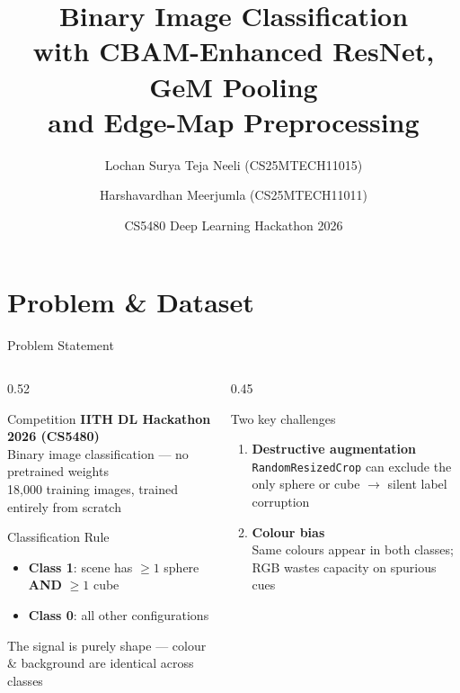 \documentclass[aspectratio=169]{beamer}
\author[Neeli \& Meerjumla]{%
  Lochan Surya Teja Neeli (CS25MTECH11015) \and
  Harshavardhan Meerjumla (CS25MTECH11011)}
\title[Binary Classification — CS5480]{%
  Binary Image Classification\\
  with CBAM-Enhanced ResNet, GeM Pooling\\
  and Edge-Map Preprocessing}
\institute[IIT Hyderabad]{Department of CSE, IIT Hyderabad}
\date{CS5480 Deep Learning Hackathon 2026}
\begin{document}
\begin{frame}
  \titlepage
\end{frame}

\section{Problem \& Dataset}

\begin{frame}[t,shrink=8]{Problem Statement}
  \begin{columns}[T]
    \begin{column}{0.52\textwidth}
      \begin{block}{Competition}
        \footnotesize \textbf{IITH DL Hackathon 2026 (CS5480)}\\
        Binary image classification — \alert{no pretrained weights}\\
        18,000 training images, trained entirely from scratch
      \end{block}
      \smallskip
      \begin{block}{Classification Rule}
        \footnotesize
        \begin{itemize}
          \item \textbf{Class 1}: scene has $\geq1$ sphere \textbf{AND} $\geq1$ cube
          \item \textbf{Class 0}: all other configurations
        \end{itemize}
        The signal is \alert{purely shape} — colour \& background are identical across classes
      \end{block}
    \end{column}
    \begin{column}{0.45\textwidth}
      \begin{block}{Two key challenges}
        \footnotesize
        \begin{enumerate}
          \item \textbf{Destructive augmentation}\\
                \texttt{RandomResizedCrop} can exclude the only sphere or cube $\to$ silent label corruption
          \item \textbf{Colour bias}\\
                Same colours appear in both classes; RGB wastes capacity on spurious cues
        \end{enumerate}
      \end{block}
    \end{column}
  \end{columns}
\end{frame}
\end{document}
